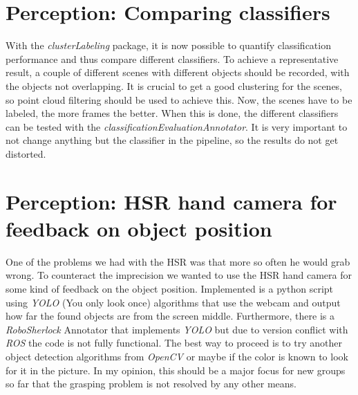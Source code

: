 \documentclass[main.tex]{subfiles}
\begin{document}
		\section{Perception: Comparing classifiers}
		With the \textit{clusterLabeling} package, it is now possible to quantify classification performance and thus compare different classifiers. To achieve a 					representative result, a couple of different scenes with different objects should be recorded, with the objects not overlapping. It is crucial to get a
		good clustering for the scenes, so point cloud filtering should be used to achieve this. Now, the scenes have to be labeled, the more frames the better. 
		When this is done, the different classifiers can be tested with the \textit{classificationEvaluationAnnotator}. It is very important to not change anything but 
		the classifier in the pipeline, so the results do not get distorted.
		
		\section{Perception: HSR hand camera for feedback on object position}\label{fut_hsr_hand_camera_feedback}
		One of the problems we had with the HSR was that more so often he would grab wrong.
		To counteract the imprecision we wanted to use the HSR hand camera for some kind of feedback on the object position.
		Implemented is a python script using \textit{YOLO} (You only look once) algorithms that use the webcam and output how far the found objects are from the screen middle.
		Furthermore, there is a \textit{RoboSherlock} Annotator that implements \textit{YOLO} but due to version conflict with \textit{ROS} the code is not fully functional.
		The best way to proceed is to try another object detection algorithms from \textit{OpenCV} or maybe if the color is known to look for it in the picture.
		In my opinion, this should be a major focus for new groups so far that the grasping problem is not resolved by any other means.

\end{document}
